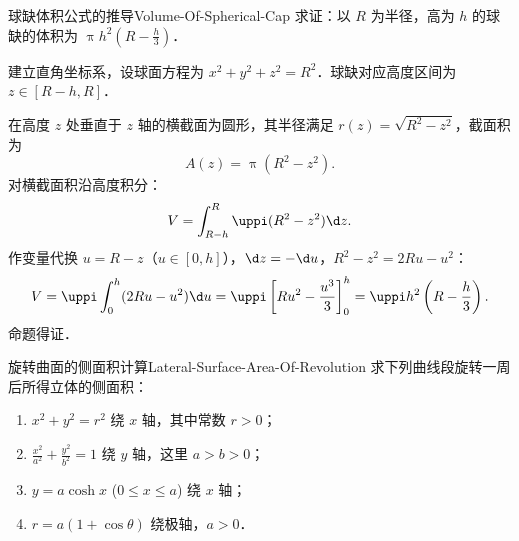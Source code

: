 \begin{problem}{球缺体积公式的推导}{Volume-Of-Spherical-Cap}
    求证：以 $R$ 为半径，高为 $h$ 的球缺的体积为 $\uppi h^2 \left(R - \frac{h}{3}\right)$．
\end{problem}

\begin{myproof}
    建立直角坐标系，设球面方程为 $x^2 + y^2 + z^2 = R^2$．球缺对应高度区间为 $z \in [R - h, R]$．

    \begin{center}
    \end{center}

    在高度 $z$ 处垂直于 $z$ 轴的横截面为圆形，其半径满足 $r(z) = \sqrt{R^2 - z^2}$，截面积为
    \begin{equation}
        A(z) = \uppi (R^2 - z^2).
    \end{equation}
    对横截面积沿高度积分：
    \begin{equation}
        V = \int_{R-h}^R \uppi (R^2 - z^2)\d z.
    \end{equation}
    作变量代换 $u = R - z$（$u \in [0, h]$），$\d z = -\d u$，$R^2 - z^2 = 2Ru - u^2$：
    \begin{equation}
        V = \uppi \int_0^h (2Ru - u^2)\d u = \uppi \left[ Ru^2 - \frac{u^3}{3} \right]_0^h = \uppi h^2 \left( R - \frac{h}{3} \right).
    \end{equation}
    命题得证．
\end{myproof}

\begin{problem}{旋转曲面的侧面积计算}{Lateral-Surface-Area-Of-Revolution}
    求下列曲线段旋转一周后所得立体的侧面积：
    \begin{enumerate}
        \item $x^2 + y^2 = r^2$ 绕 $x$ 轴，其中常数 $r > 0$；
        \item $\frac{x^2}{a^2} + \frac{y^2}{b^2} = 1$ 绕 $y$ 轴，这里 $a > b > 0$；
        \item $y = a\cosh x$ ($0 \leqslant x \leqslant a$) 绕 $x$ 轴；
        \item $r = a(1 + \cos\theta)$ 绕极轴，$a > 0$．
    \end{enumerate}
\end{problem}

